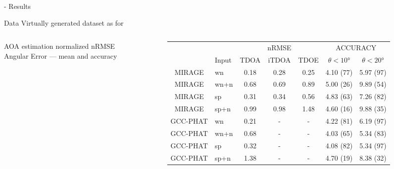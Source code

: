 \begin{frame}{\mirage - Results}

    \begin{block}{Data}
        Virtually generated dataset as for \lantern
    \end{block}

    \begin{columns}[T,onlytextwidth]

        \begin{column}{.25\textwidth}
        \begin{block}{AOA estimation}
            normalized nRMSE
            \\Angular Error --- mean and accuracy
        \end{block}
        \end{column}

        \begin{column}{.74\textwidth}

            \centering
            \small
            \begin{tabular}{cl|ccc|cc}
            \toprule
            &                  &         & nRMSE                         &              &\multicolumn{2}{c}{ACCURACY}  \\
            & Input            &    \scriptsize{TDOA}    &   \scriptsize{iTDOA} 		 &     \scriptsize{TDOE} 		 & $\theta<\ang{10}$ &  $\theta<\ang{20}$ \\
            \midrule
            MIRAGE     &   wn          &    0.18 & 0.28          &    0.25 	         & 4.10 (77)    &  5.97 (97) \\
            MIRAGE     &   wn+n        &    0.68 & 0.69          &    0.89 			 & 5.00 (26)    &  9.89 (54) \\
            MIRAGE     &   sp          &    0.31 & 0.34          &    0.56           & 4.83 (63)    &  7.26 (82) \\
            MIRAGE     &   sp+n        &    0.99 & 0.98   	     &    1.48 			 & 4.60 (16)    &  9.88 (35) \\
            GCC-PHAT   &   wn          &    0.21 &     -  		 &       -			 & 4.22 (81)    &   6.19 (97) \\
            GCC-PHAT   &   wn+n        &    0.68 &     -  		 &       -			 & 4.03 (65)    &   5.34 (83) \\
            GCC-PHAT   &   sp 		   &    0.32 &     -  		 &       -			 & 4.08 (82)    &   5.34 (97) \\
            GCC-PHAT   &   sp+n        &    1.38 &     -  		 &       -			 & 4.70 (19)    &   8.38 (32) \\
            \bottomrule
        \end{tabular}


\end{column}
\end{columns}
\end{frame}
